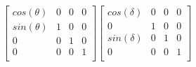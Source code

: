 $$
\begin{bmatrix}
  cos(θ) & 0 & 0 & 0 \\ 
  sin(θ) & 1 & 0 & 0 \\ 
  0 & 0 & 1 & 0 \\ 
  0 & 0 & 0 & 1 \\ 
\end{bmatrix}
\begin{bmatrix}
  cos(δ) & 0 & 0 & 0 \\ 
  0 & 1 & 0 & 0 \\ 
  sin(δ) & 0 & 1 & 0 \\ 
  0 & 0 & 0 & 1 \\ 
\end{bmatrix}
$$